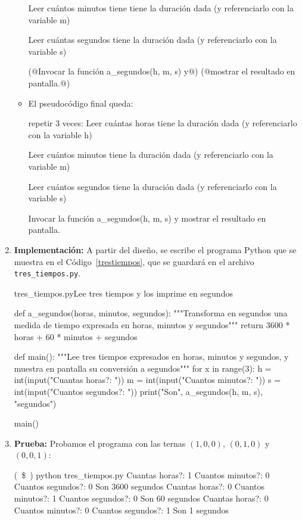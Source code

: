 \begin{enumerate}
\begin{itemize}
\begin{codigo-nohl-sn}
Leer cuántos minutos tiene tiene la duración dada
 (y referenciarlo con la variable m)

Leer cuántas segundos tiene la duración dada
 (y referenciarlo con la variable s)

(@Invocar la función a_segundos(h, m, s) y@)
(@mostrar el resultado en pantalla.@)
\end{codigo-nohl-sn}

\item El pseudocódigo final queda:

\begin{codigo-nohl-sn}
repetir 3 veces:
    Leer cuántas horas tiene la duración dada
     (y referenciarlo con la variable h)

    Leer cuántos minutos tiene la duración dada
     (y referenciarlo con la variable m)

    Leer cuántos segundos tiene la duración dada
     (y referenciarlo con la variable s)

    Invocar la función a_segundos(h, m, s) y
    mostrar el resultado en pantalla.
\end{codigo-nohl-sn}

\end{itemize}
\item {\bf Implementación:} A partir del diseño, se escribe el programa
Python que se muestra en el Código~\ref{trestiempos}, que se guardará
en el archivo \verb!tres_tiempos.py!.

\begin{codigo}{\label{trestiempos} tres\_tiempos.py}{Lee tres tiempos y los imprime en segundos}
\begin{codigo-python}
def a_segundos(horas, minutos, segundos):
    """Transforma en segundos una medida de tiempo expresada en
       horas, minutos y segundos"""
    return 3600 * horas + 60 * minutos + segundos

def main():
    """Lee tres tiempos expresados en horas, minutos y segundos,
       y muestra en pantalla su conversión a segundos"""
    for x in range(3):
        h = int(input("Cuantas horas?: "))
        m = int(input("Cuantos minutos?: "))
        s = int(input("Cuantos segundos?: "))
        print("Son", a_segundos(h, m, s), "segundos")

main()
\end{codigo-python}
\end{codigo}

\item {\bf Prueba: } Probamos el programa con las ternas $(1,0,0)$, $(0,1,0)$ y
$(0,0,1)$:

\begin{codigo-nohl-sn}
(~\$~) python tres_tiempos.py
Cuantas horas?: 1
Cuantos minutos?: 0
Cuantos segundos?: 0
Son 3600 segundos
Cuantas horas?: 0
Cuantos minutos?: 1
Cuantos segundos?: 0
Son 60 segundos
Cuantas horas?: 0
Cuantos minutos?: 0
Cuantos segundos?: 1
Son 1 segundos
\end{codigo-nohl-sn}
\end{enumerate}

